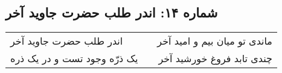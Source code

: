 \begin{center}
\section*{شماره ۱۴: اندر طلب حضرت جاوید آخر}
\label{sec:014}
\begin{longtable}{l p{0.5cm} r}
اندر طلب حضرت جاوید آخر
&&
ماندی تو میان بیم و امید آخر
\\
یک ذرّه وجود تست و در یک ذره
&&
چندی تابد فروغ خورشید آخر
\\
\end{longtable}
\end{center}
